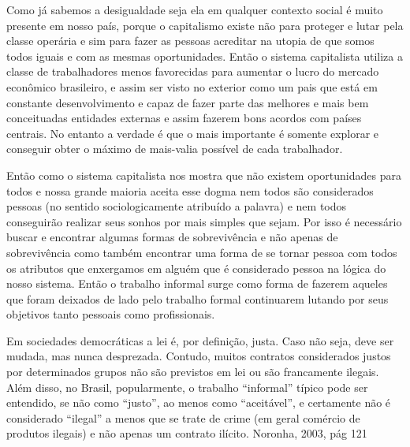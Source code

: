 Como já sabemos a desigualdade seja ela em qualquer contexto social é muito presente em nosso país, porque o 
capitalismo existe não para proteger e lutar pela classe operária e sim para fazer as pessoas acreditar na 
utopia de que somos todos iguais e com as mesmas oportunidades. Então o sistema capitalista utiliza a classe 
de trabalhadores menos favorecidas para aumentar o lucro do mercado econômico brasileiro, e assim ser visto 
no exterior como um pais que está em constante desenvolvimento e capaz de fazer parte das melhores e mais 
bem conceituadas entidades externas e assim fazerem bons acordos com países centrais. No entanto a verdade 
é que o mais importante é somente explorar e conseguir obter o máximo de mais-valia possível de cada trabalhador. 

Então como o sistema capitalista nos mostra que não existem oportunidades para todos e nossa grande maioria 
aceita esse dogma nem todos são considerados pessoas (no sentido sociologicamente atribuído a palavra) e nem 
todos conseguirão realizar seus sonhos por mais simples que sejam. Por isso é necessário buscar e encontrar 
algumas formas de sobrevivência e não apenas de sobrevivência como também encontrar uma forma de se tornar 
pessoa com todos os atributos que enxergamos em alguém que é considerado pessoa na lógica do nosso sistema. 
Então o trabalho informal surge como forma de fazerem aqueles que foram deixados de lado pelo trabalho 
formal continuarem lutando por seus objetivos tanto pessoais como profissionais.

\begin{citacao}
Em sociedades democráticas a lei é, por definição, justa. Caso não seja, deve ser mudada, mas nunca desprezada. 
Contudo, muitos contratos considerados justos por determinados grupos não são previstos em lei ou são francamente
ilegais. Além disso, no Brasil, popularmente, o trabalho “informal” típico pode ser entendido, se não como “justo”,
ao menos como “aceitável”, e certamente não é considerado “ilegal” a menos que se trate de crime (em geral comércio
de produtos ilegais) e não apenas um contrato ilícito. Noronha, 2003, pág 121 
\end{citacao}


